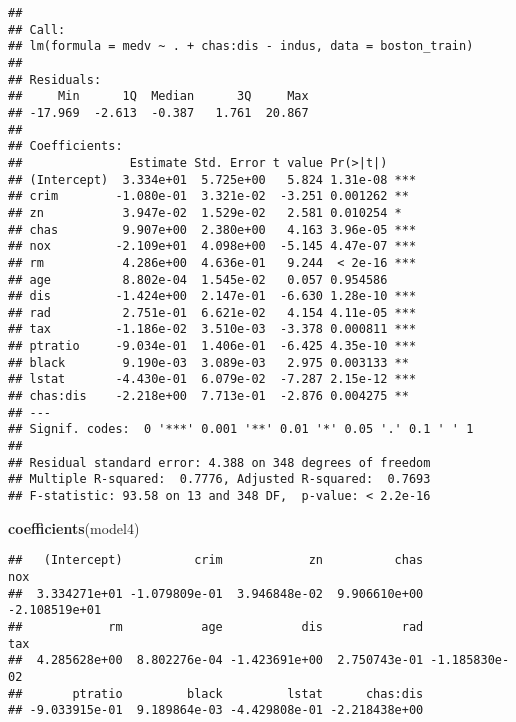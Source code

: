 \documentclass[
]{article}
\newenvironment{Shaded}{\begin{snugshade}}{\end{snugshade}}
\newcommand{\CommentTok}[1]{\textcolor[rgb]{0.56,0.35,0.01}{\textit{#1}}}
\newcommand{\DataTypeTok}[1]{\textcolor[rgb]{0.13,0.29,0.53}{#1}}
\newcommand{\KeywordTok}[1]{\textcolor[rgb]{0.13,0.29,0.53}{\textbf{#1}}}
\newcommand{\NormalTok}[1]{#1}
\newcommand{\OperatorTok}[1]{\textcolor[rgb]{0.81,0.36,0.00}{\textbf{#1}}}
\newcommand{\StringTok}[1]{\textcolor[rgb]{0.31,0.60,0.02}{#1}}
\begin{document}
\begin{verbatim}
## 
## Call:
## lm(formula = medv ~ . + chas:dis - indus, data = boston_train)
## 
## Residuals:
##     Min      1Q  Median      3Q     Max 
## -17.969  -2.613  -0.387   1.761  20.867 
## 
## Coefficients:
##               Estimate Std. Error t value Pr(>|t|)    
## (Intercept)  3.334e+01  5.725e+00   5.824 1.31e-08 ***
## crim        -1.080e-01  3.321e-02  -3.251 0.001262 ** 
## zn           3.947e-02  1.529e-02   2.581 0.010254 *  
## chas         9.907e+00  2.380e+00   4.163 3.96e-05 ***
## nox         -2.109e+01  4.098e+00  -5.145 4.47e-07 ***
## rm           4.286e+00  4.636e-01   9.244  < 2e-16 ***
## age          8.802e-04  1.545e-02   0.057 0.954586    
## dis         -1.424e+00  2.147e-01  -6.630 1.28e-10 ***
## rad          2.751e-01  6.621e-02   4.154 4.11e-05 ***
## tax         -1.186e-02  3.510e-03  -3.378 0.000811 ***
## ptratio     -9.034e-01  1.406e-01  -6.425 4.35e-10 ***
## black        9.190e-03  3.089e-03   2.975 0.003133 ** 
## lstat       -4.430e-01  6.079e-02  -7.287 2.15e-12 ***
## chas:dis    -2.218e+00  7.713e-01  -2.876 0.004275 ** 
## ---
## Signif. codes:  0 '***' 0.001 '**' 0.01 '*' 0.05 '.' 0.1 ' ' 1
## 
## Residual standard error: 4.388 on 348 degrees of freedom
## Multiple R-squared:  0.7776, Adjusted R-squared:  0.7693 
## F-statistic: 93.58 on 13 and 348 DF,  p-value: < 2.2e-16
\end{verbatim}

\begin{Shaded}
\begin{Highlighting}[]
\KeywordTok{coefficients}\NormalTok{(model4)}
\end{Highlighting}
\end{Shaded}

\begin{verbatim}
##   (Intercept)          crim            zn          chas           nox 
##  3.334271e+01 -1.079809e-01  3.946848e-02  9.906610e+00 -2.108519e+01 
##            rm           age           dis           rad           tax 
##  4.285628e+00  8.802276e-04 -1.423691e+00  2.750743e-01 -1.185830e-02 
##       ptratio         black         lstat      chas:dis 
## -9.033915e-01  9.189864e-03 -4.429808e-01 -2.218438e+00
\end{verbatim}

\begin{Shaded}
\end{Shaded}
\end{document}
